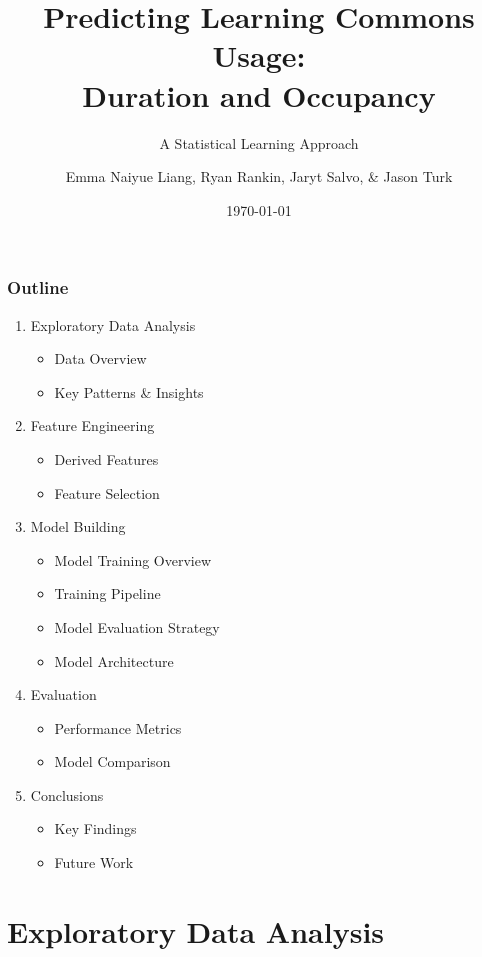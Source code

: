 \documentclass{beamer}
\title{Predicting Learning Commons Usage:\\Duration and Occupancy}
\subtitle{A Statistical Learning Approach}
\author{Emma Naiyue Liang, Ryan Rankin, Jaryt Salvo, \& Jason Turk}
\institute{MATH 7550 Statistical Learning | BGSU}
\date{\today}
\begin{document}
\begin{frame}
\titlepage
\end{frame}

\begin{frame}
\frametitle{Outline}
    \begin{enumerate}
        \item Exploratory Data Analysis
            \begin{itemize}
            \item Data Overview
            \item Key Patterns & Insights
            \end{itemize}
        \item Feature Engineering
            \begin{itemize}
            \item Derived Features
            \item Feature Selection
            \end{itemize}
        \item Model Building
            \begin{itemize}
            \item Model Training Overview
            \item Training Pipeline
            \item Model Evaluation Strategy
            \item Model Architecture
            \end{itemize}
        \item Evaluation
            \begin{itemize}
            \item Performance Metrics
            \item Model Comparison
            \end{itemize}
        \item Conclusions
            \begin{itemize}
            \item Key Findings
            \item Future Work
            \end{itemize}
    \end{enumerate}
\end{frame}

\section{Exploratory Data Analysis}
\end{document}
